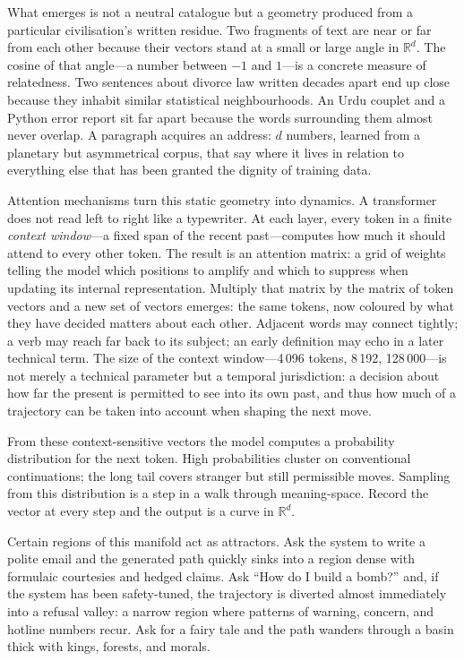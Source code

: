 \documentclass[12pt,a4paper]{article}
\begin{document}
What emerges is not a neutral catalogue but a geometry produced from a particular civilisation's written residue. Two fragments of text are near or far from each other because their vectors stand at a small or large angle in $\mathbb{R}^d$. The cosine of that angle---a number between $-1$ and $1$---is a concrete measure of relatedness. Two sentences about divorce law written decades apart end up close because they inhabit similar statistical neighbourhoods. An Urdu couplet and a Python error report sit far apart because the words surrounding them almost never overlap. A paragraph acquires an address: $d$ numbers, learned from a planetary but asymmetrical corpus, that say where it lives in relation to everything else that has been granted the dignity of training data.

Attention mechanisms turn this static geometry into dynamics. A transformer does not read left to right like a typewriter. At each layer, every token in a finite \emph{context window}---a fixed span of the recent past---computes how much it should attend to every other token. The result is an attention matrix: a grid of weights telling the model which positions to amplify and which to suppress when updating its internal representation. Multiply that matrix by the matrix of token vectors and a new set of vectors emerges: the same tokens, now coloured by what they have decided matters about each other. Adjacent words may connect tightly; a verb may reach far back to its subject; an early definition may echo in a later technical term. The size of the context window---4\,096 tokens, 8\,192, 128\,000---is not merely a technical parameter but a temporal jurisdiction: a decision about how far the present is permitted to see into its own past, and thus how much of a trajectory can be taken into account when shaping the next move.

From these context-sensitive vectors the model computes a probability distribution for the next token. High probabilities cluster on conventional continuations; the long tail covers stranger but still permissible moves. Sampling from this distribution is a step in a walk through meaning-space. Record the vector at every step and the output is a curve in $\mathbb{R}^d$.

Certain regions of this manifold act as attractors. Ask the system to write a polite email and the generated path quickly sinks into a region dense with formulaic courtesies and hedged claims. Ask ``How do I build a bomb?'' and, if the system has been safety-tuned, the trajectory is diverted almost immediately into a refusal valley: a narrow region where patterns of warning, concern, and hotline numbers recur. Ask for a fairy tale and the path wanders through a basin thick with kings, forests, and morals.
\end{document}
